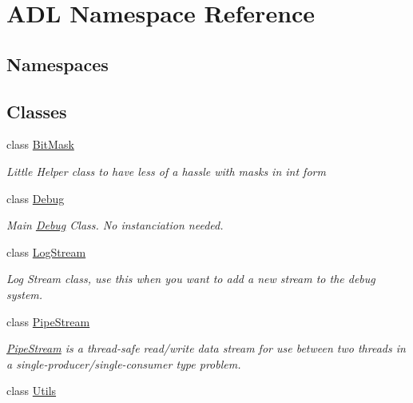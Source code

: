 \hypertarget{namespace_a_d_l}{}\section{A\+DL Namespace Reference}
\label{namespace_a_d_l}
\subsection*{Namespaces}
\begin{DoxyCompactItemize}
\end{DoxyCompactItemize}
\subsection*{Classes}
\begin{DoxyCompactItemize}
\item 
class \mbox{\hyperlink{class_a_d_l_1_1_bit_mask}{Bit\+Mask}}
\begin{DoxyCompactList}\small\item\em Little Helper class to have less of a hassle with masks in int form \end{DoxyCompactList}\item 
class \mbox{\hyperlink{class_a_d_l_1_1_debug}{Debug}}
\begin{DoxyCompactList}\small\item\em Main \mbox{\hyperlink{class_a_d_l_1_1_debug}{Debug}} Class. No instanciation needed. \end{DoxyCompactList}\item 
class \mbox{\hyperlink{class_a_d_l_1_1_log_stream}{Log\+Stream}}
\begin{DoxyCompactList}\small\item\em Log Stream class, use this when you want to add a new stream to the debug system. \end{DoxyCompactList}\item 
class \mbox{\hyperlink{class_a_d_l_1_1_pipe_stream}{Pipe\+Stream}}
\begin{DoxyCompactList}\small\item\em \mbox{\hyperlink{class_a_d_l_1_1_pipe_stream}{Pipe\+Stream}} is a thread-\/safe read/write data stream for use between two threads in a single-\/producer/single-\/consumer type problem. \end{DoxyCompactList}\item 
class \mbox{\hyperlink{class_a_d_l_1_1_utils}{Utils}}
\end{DoxyCompactItemize}
